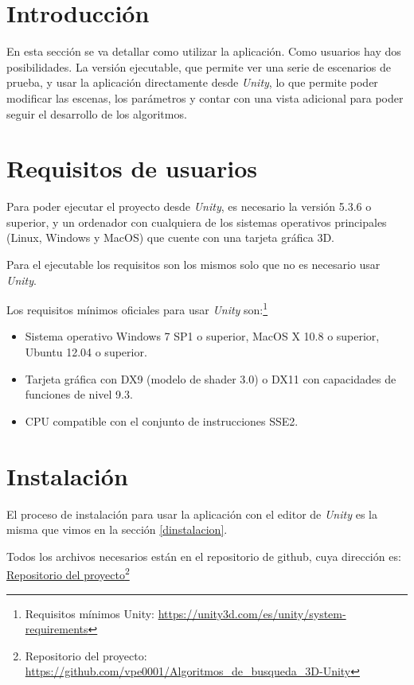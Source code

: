 
\section{Introducción}
En esta sección se va detallar como utilizar la aplicación. Como usuarios hay dos posibilidades. La versión ejecutable, que permite ver una serie de escenarios de prueba, y usar la aplicación directamente desde \textit{Unity}, lo que permite poder modificar las escenas, los parámetros y contar con una vista adicional para poder seguir el desarrollo de los algoritmos.

\section{Requisitos de usuarios}
Para poder ejecutar el proyecto desde \textit{Unity}, es necesario la versión 5.3.6 o superior, y un ordenador con cualquiera de los sistemas operativos principales (Linux, Windows y MacOS) que cuente con una tarjeta gráfica 3D.

Para el ejecutable los requisitos son los mismos solo que no es necesario usar \textit{Unity}.

Los requisitos mínimos oficiales para usar \textit{Unity} son:\footnote{Requisitos mínimos Unity: \url{https://unity3d.com/es/unity/system-requirements}}
\begin{itemize}
\item Sistema operativo Windows 7 SP1 o superior, MacOS X 10.8 o superior, Ubuntu 12.04 o superior.
\item Tarjeta gráfica con DX9 (modelo de shader 3.0) o DX11 con capacidades de funciones de nivel 9.3.
\item CPU compatible con el conjunto de instrucciones SSE2.
\end{itemize}

\section{Instalación}
El proceso de instalación para usar la aplicación con el editor de \textit{Unity} es la misma que vimos en la sección \ref{dinstalacion}.

Todos los archivos necesarios están en el repositorio de github, cuya dirección es: \href{https://github.com/vpe0001/Algoritmos\_de\_busqueda\_3D-Unity}{Repositorio del proyecto}\footnote{Repositorio del proyecto: \url{https://github.com/vpe0001/Algoritmos\_de\_busqueda\_3D-Unity}}

